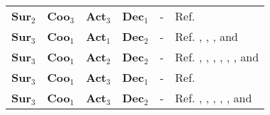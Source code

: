 \begin{table}[h]
\begin{center}
\begin{tabular}{lccccl}
        \textbf{Sur}$_2$ & \textbf{Coo}$_3$ & \textbf{Act}$_3$  & \textbf{Dec}$_1$ & - & Ref. \cite{Winder:99}\\
        \textbf{Sur}$_3$ & \textbf{Coo}$_1$ & \textbf{Act}$_1$  & \textbf{Dec}$_2$ & - & Ref.  \cite{Kelly:06}\tnote{\dag}, \cite{Langelaan:07}\tnote{\dag}, \cite{Obermeyer:12}\tnote{\dag}, and \cite{Chowdhary:12}\tnote{\dag}\\
        \textbf{Sur}$_3$ & \textbf{Coo}$_1$ & \textbf{Act}$_2$  & \textbf{Dec}$_2$ & - & Ref. \cite{Netter:02}\tnote{\dag}, \cite{Nikolos:03}\tnote{\dag}, \cite{Yang:04}\tnote{\dag}, \cite{McGee:05}\tnote{\dag}, \cite{Patel:11}\tnote{\dag}, \cite{Hrabar:11}\tnote{\dag}, and \cite{Jung:13}\tnote{\dag} \\
        \textbf{Sur}$_3$ & \textbf{Coo}$_1$ & \textbf{Act}$_3$  & \textbf{Dec}$_1$ & - & Ref. \cite{Lam:09b}\tnote{\dag}\\
        \textbf{Sur}$_3$ & \textbf{Coo}$_1$ & \textbf{Act}$_3$  & \textbf{Dec}$_2$ & - & Ref. \cite{Muratet:05}\tnote{\dag}, \cite{Beyeler:09}\tnote{\dag}, \cite{Bouabdallah:07}\tnote{\dag}, \cite{deCroon:11}\tnote{\dag}, \cite{deCroon:12}\tnote{\dag}, and \cite{Muller:14}\tnote{\dag} \\

\end{tabular}
\end{center}
\end{table}
